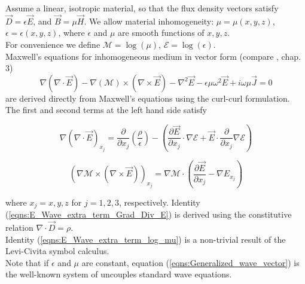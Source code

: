 \documentclass[twocolumn,secnumarabic,amssymb, nobibnotes, aps, prd]{revtex4-1}
\begin{document}
Assume a linear, isotropic material, so that the flux density vectors satisfy $\overrightarrow{D}=\epsilon \overrightarrow{E}$, and $\overrightarrow{B} =\mu \overrightarrow{H}$. We allow material inhomogeneity: $\mu=\mu(x,y,z)$, $\epsilon = \epsilon(x,y,z)$, where $\epsilon$ and $\mu$ are smooth functions of $x,y,z$.\\ 
For convenience we define $\mathcal{M} = \log(\mu)$, $\mathcal{E} = \log(\epsilon)$. \\
Maxwell's equations for inhomogeneous medium in vector form (compare \cite{goodman2005introduction}, chap. 3) 
\begin{equation}
\label{eqns:Generalized_wave_vector}
\nabla (\nabla \cdot \overrightarrow{E})-\nabla(\mathcal{M}) \times \left(\nabla \times \overrightarrow{E} \right) - \nabla^2 \overrightarrow{E} -\epsilon \mu \omega^2 \overrightarrow{E} + i \omega \mu \overrightarrow{J} = 0
\end{equation}
are derived directly from Maxwell's equations using the curl-curl formulation. The first and second terms at the left hand side satisfy

\begin{equation}
\nabla \left( \nabla \cdot \overrightarrow{E} \right)_{x_j} = \frac{\partial}{\partial x_j}\left( \frac{\rho}{\epsilon}\right) - \left(\frac{\partial \overrightarrow{E}}{\partial x_j} \cdot \nabla \mathcal{E} + \overrightarrow{E} \cdot \frac{\partial}{\partial x_j} \nabla \mathcal{E} \right)
\label{eqns:E_Wave_extra_term_Grad_Div_E} 
\end{equation}

\begin{equation}
\left(\nabla \mathcal{M} \times \left(\nabla \times \overrightarrow{E} \right) \right)_{x_j} = 
\nabla \mathcal{M} \cdot \left( \frac{\partial \overrightarrow{E}}{\partial x_j}- \nabla E_{x_j} \right)
\label{eqns:E_Wave_extra_term_log_mu}
\end{equation}

where $x_j = x,y,z$ for $j=1,2,3$, respectively. Identity (\ref{eqns:E_Wave_extra_term_Grad_Div_E}) is derived using the constitutive relation
$\nabla \cdot \overrightarrow{D} = \rho$. \\
Identity (\ref{eqns:E_Wave_extra_term_log_mu}) is a non-trivial result of the Levi-Civita symbol calculus.\\
Note that if $\epsilon$ and $\mu$ are constant, equation (\ref{eqns:Generalized_wave_vector}) is the well-known system of uncouples standard wave equations.
\end{document}
